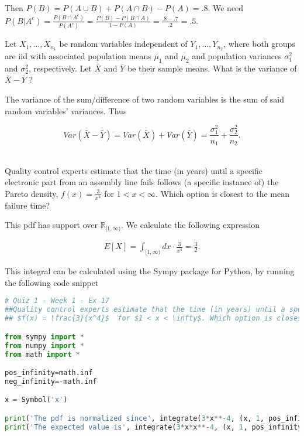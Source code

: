 \documentclass{homework}
\begin{document}
Then $P(B) = P(A \cup B) + P(A \cap B) - P(A) = .8$. We need $P(B|A^{c}) = \frac{P(B \cap A^{c})}{P(A^{c})} = \frac{P(B) - P(B \cap A)}{1-P(A)} = \frac{.8-.7}{.2}=.5$. \\

\begin{tcolorbox}[title=Question 16]
Let $X_1,\ldots, X_{n_1}$ be random variables independent of $Y_1,\ldots, Y_{n_2}$, where both groups are iid with associated population means $\mu_1$ and $\mu_2$ and population variances $\sigma_1^2$ and $\sigma_2^2$, respectively. Let $\bar X$ and $\bar Y $ be their sample means. What is the variance of $\bar X - \bar Y$ ?
\end{tcolorbox}

The variance of the sum/difference of two random variables is the sum of said random variables' variances. Thus

$$
Var(\bar X - \bar Y) = Var(\bar X)+Var(\bar Y) = \frac{\sigma_1^2}{n_1} + \frac{\sigma_2^2}{n_2}.
$$ \\

\begin{tcolorbox}[title=Question 17]
Quality control experts estimate that the time (in years) until a specific electronic part from an assembly line fails follows (a specific instance of) the Pareto density, $f(x) = \frac{3}{x^4}$  for $1 < x < \infty$. Which option is closest to the mean failure time?
\end{tcolorbox}

This pdf has support over $\mathds{R}_{[1,\infty)}$. We calculate the following expression

\begin{align*}
    E[X] = \int_{[1,\infty)} dx \cdot \frac{3}{x^4} = \frac{3}{2}.
\end{align*}

This integral can be calculated using the Sympy package for Python, by running the following code snippet

\begin{lstlisting}[language=Python]
# Quiz 1 - Week 1 - Ex 17
##Quality control experts estimate that the time (in years) until a specific electronic part from an assembly line fails follows (a specific instance of) the Pareto density,
## $f(x) = \frac{3}{x^4}$  for $1 < x < \infty$. Which option is closest to the mean failure time?

from sympy import *
from numpy import *
from math import *

pos_infinity=math.inf
neg_infinity=-math.inf

x = Symbol('x')

print('The pdf is normalized since', integrate(3*x**-4, (x, 1, pos_infinity)))
print('The expected value is', integrate(3*x*x**-4, (x, 1, pos_infinity)))
\end{lstlisting} 
\end{document}
